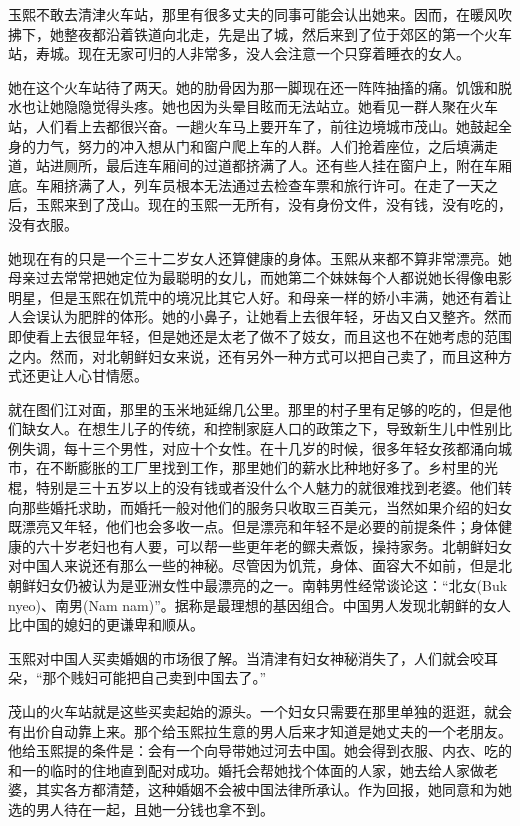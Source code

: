 玉熙不敢去清津火车站，那里有很多丈夫的同事可能会认出她来。因而，在暖风吹拂下，她整夜都沿着铁道向北走，先是出了城，然后来到了位于郊区的第一个火车站，寿城。现在无家可归的人非常多，没人会注意一个只穿着睡衣的女人。

她在这个火车站待了两天。她的肋骨因为那一脚现在还一阵阵抽搐的痛。饥饿和脱水也让她隐隐觉得头疼。她也因为头晕目眩而无法站立。她看见一群人聚在火车站，人们看上去都很兴奋。一趟火车马上要开车了，前往边境城市茂山。她鼓起全身的力气，努力的冲入想从门和窗户爬上车的人群。人们抢着座位，之后填满走道，站进厕所，最后连车厢间的过道都挤满了人。还有些人挂在窗户上，附在车厢底。车厢挤满了人，列车员根本无法通过去检查车票和旅行许可。在走了一天之后，玉熙来到了茂山。现在的玉熙一无所有，没有身份文件，没有钱，没有吃的，没有衣服。

她现在有的只是一个三十二岁女人还算健康的身体。玉熙从来都不算非常漂亮。她母亲过去常常把她定位为最聪明的女儿，而她第二个妹妹每个人都说她长得像电影明星，但是玉熙在饥荒中的境况比其它人好。和母亲一样的娇小丰满，她还有着让人会误认为肥胖的体形。她的小鼻子，让她看上去很年轻，牙齿又白又整齐。然而即使看上去很显年轻，但是她还是太老了做不了妓女，而且这也不在她考虑的范围之内。然而，对北朝鲜妇女来说，还有另外一种方式可以把自己卖了，而且这种方式还更让人心甘情愿。

就在图们江对面，那里的玉米地延绵几公里。那里的村子里有足够的吃的，但是他们缺女人。在想生儿子的传统，和控制家庭人口的政策之下，导致新生儿中性别比例失调，每十三个男性，对应十个女性。在十几岁的时候，很多年轻女孩都涌向城市，在不断膨胀的工厂里找到工作，那里她们的薪水比种地好多了。乡村里的光棍，特别是三十五岁以上的没有钱或者没什么个人魅力的就很难找到老婆。他们转向那些婚托求助，而婚托一般对他们的服务只收取三百美元，当然如果介绍的妇女既漂亮又年轻，他们也会多收一点。但是漂亮和年轻不是必要的前提条件；身体健康的六十岁老妇也有人要，可以帮一些更年老的鳏夫煮饭，操持家务。北朝鲜妇女对中国人来说还有那么一些的神秘。尽管因为饥荒，身体、面容大不如前，但是北朝鲜妇女仍被认为是亚洲女性中最漂亮的之一。南韩男性经常谈论这：“北女(Buk nyeo)、南男(Nam nam)”。据称是最理想的基因组合。中国男人发现北朝鲜的女人比中国的媳妇的更谦卑和顺从。

玉熙对中国人买卖婚姻的市场很了解。当清津有妇女神秘消失了，人们就会咬耳朵，“那个贱妇可能把自己卖到中国去了。”

茂山的火车站就是这些买卖起始的源头。一个妇女只需要在那里单独的逛逛，就会有出价自动靠上来。那个给玉熙拉生意的男人后来才知道是她丈夫的一个老朋友。他给玉熙提的条件是：会有一个向导带她过河去中国。她会得到衣服、内衣、吃的和一的临时的住地直到配对成功。婚托会帮她找个体面的人家，她去给人家做老婆，其实各方都清楚，这种婚姻不会被中国法律所承认。作为回报，她同意和为她选的男人待在一起，且她一分钱也拿不到。

